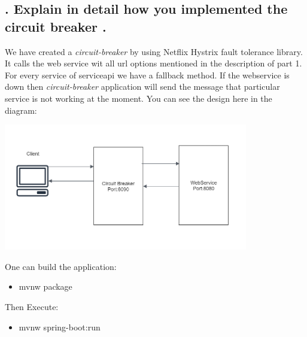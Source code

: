 
\subsection{. Explain in detail how you implemented the circuit
breaker
.}

We have created a \textit{circuit-breaker} by using Netflix Hystrix fault tolerance library. It calls the web service wit all url options mentioned in the description of part 1. For every service of serviceapi we have a fallback method. If the webservice is down then \textit{circuit-breaker} application will send the message that particular service is not working at the moment. You can see the design here in the diagram:

\includegraphics[keepaspectratio,width=0.8\textwidth,angle=0]{images/Circuit.PNG}

One can build the application:

\begin{itemize}
\item mvnw package
\end{itemize}

Then Execute:

\begin{itemize}

\item mvnw spring-boot:run

\end{itemize}
